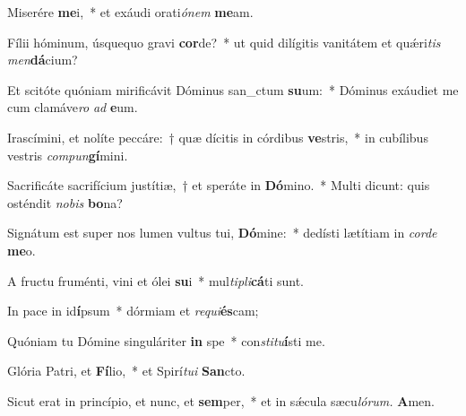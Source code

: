 \item Miserére \textbf{me}i,~* et exáudi orati\textit{ónem} \textbf{me}am.
\item Fílii hóminum, úsquequo gravi \textbf{cor}de?~* ut quid dilígitis vanitátem et quǽri\hspace{0.02em}\textit{tis} \textit{men}\textbf{dá}cium?
\item Et scitóte quóniam mirificávit Dóminus san\_ctum \textbf{su}um:~* Dóminus exáudiet me cum clamáve\teenyhspace\textit{ro} \textit{ad} \textbf{e}um.
\item Irascímini, et nolíte peccáre:~† quæ dícitis in córdibus \textbf{ve}stris,~* in cubílibus vestris \textit{compun}\textbf{gí}mini.
\item Sacrificáte sacrifícium justítiæ,~† et speráte in \textbf{Dó}mino.~* Multi dicunt: quis osténdit \textit{nobis} \textbf{bo}na?
\item Signátum est super nos lumen vultus tui, \textbf{Dó}mine:~* dedísti lætítiam in \textit{corde} \textbf{me}o.
\item A fru\-ctu fruménti, vini et ólei \textbf{su}i~* mul\textit{tipli}\textbf{cá}ti sunt.
\item In pace in id\textbf{í}psum~* dórmiam et \textit{requi}\textbf{és}cam;
\item Quóniam tu Dómine singuláriter \textbf{in} spe~* con\tinyhspace\textit{stitu}\textbf{í}sti me.
\item Glória Patri, et \textbf{Fí}lio,~* et Spirí\tinyhspace\textit{tui} \textbf{San}cto.
\item Sicut erat in princípio, et nunc, et \textbf{sem}per,~* et in sǽcula sæcu\tinyhspace\textit{lórum.} \textbf{A}men.
